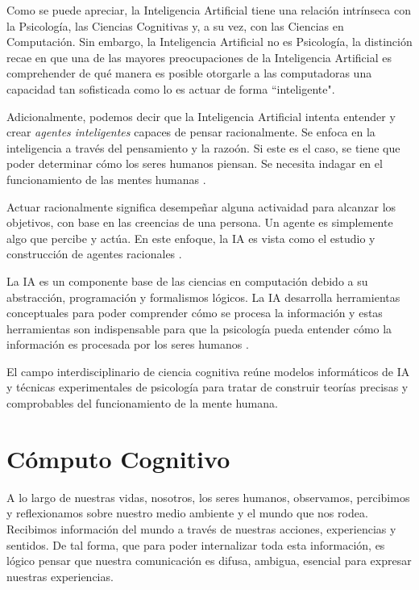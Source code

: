 Como se puede apreciar, la Inteligencia Artificial tiene una relaci\'{o}n intr\'{i}nseca con la Psicolog\'{i}a, las Ciencias Cognitivas y, a su vez, con las Ciencias en Computaci\'{o}n. Sin embargo, la Inteligencia Artificial no es Psicolog\'{i}a, la distinci\'{o}n recae en que una de las mayores preocupaciones de la Inteligencia Artificial es comprehender de qu\'{e} manera es posible otorgarle a las computadoras una capacidad tan sofisticada como lo es actuar de forma “inteligente".

Adicionalmente, podemos decir que la Inteligencia Artificial intenta entender y crear \emph{agentes inteligentes} capaces de pensar racionalmente. Se enfoca en la inteligencia a trav\'{e}s del pensamiento y la razo\'{o}n. Si este es el caso, se tiene que poder determinar c\'{o}mo los seres humanos piensan. Se necesita indagar en el funcionamiento de las mentes humanas \cite{brooks1995intelligence}.

Actuar racionalmente significa desempe\~nar alguna activaidad para alcanzar los objetivos, con base en las creencias de una persona. Un agente es simplemente algo que percibe y actúa. En este enfoque, la IA es vista como el estudio y construcción de agentes racionales \cite{aimodern}.

La IA es un componente base de las ciencias en computaci\'{o}n debido a su abstracción, programación y formalismos lógicos. La IA  desarrolla  herramientas conceptuales para poder comprender c\'{o}mo se procesa la información y estas herramientas son indispensable para que la psicología pueda entender cómo la información es procesada por los seres humanos \cite{nilsson2014principles}.

El campo interdisciplinario de ciencia cognitiva reúne modelos informáticos de IA y técnicas experimentales de
psicología para tratar de construir teorías precisas y comprobables del funcionamiento de la mente humana.

\section{C\'{o}mputo Cognitivo}

A lo largo de nuestras vidas, nosotros, los seres humanos, observamos, percibimos y reflexionamos sobre nuestro medio ambiente y el mundo que nos rodea. Recibimos informaci\'{o}n del mundo a trav\'{e}s de nuestras acciones, experiencias y sentidos. De tal forma, que para poder internalizar toda esta informaci\'{o}n, es l\'{o}gico pensar que nuestra comunicaci\'{o}n es difusa, ambigua, esencial para expresar nuestras experiencias. 


